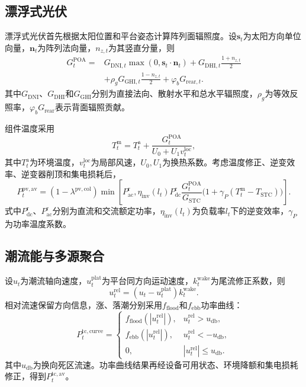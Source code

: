 \subsection{漂浮式光伏}

漂浮式光伏首先根据太阳位置和平台姿态计算阵列面辐照度。设$\bm s_t$为太阳方向单位向量，$\bm n_t$为阵列法向量，$n_{z,t}$为其竖直分量，则
\begin{equation}
\begin{aligned}
G_t^{\mathrm{POA}}={}&G_{\mathrm{DNI},t}\max(0,\bm s_t\!\cdot\!\bm n_t)
+G_{\mathrm{DHI},t}\frac{1+n_{z,t}}{2}\\
&+\rho_gG_{\mathrm{GHI},t}\frac{1-n_{z,t}}{2}
+\varphi_bG_{\mathrm{rear},t}.
\end{aligned}
\label{eq:pv-poa}
\end{equation}
其中$G_{\mathrm{DNI}}$、$G_{\mathrm{DHI}}$和$G_{\mathrm{GHI}}$分别为直接法向、散射水平和总水平辐照度，$\rho_g$为等效反照率，$\varphi_bG_{\mathrm{rear}}$表示背面辐照贡献。

组件温度采用
\[
T_t^{\mathrm m}=T_t^{\mathrm a}+\frac{G_t^{\mathrm{POA}}}{U_0+U_1v_t^{\mathrm{loc}}},
\]
其中$T_t^{\mathrm a}$为环境温度，$v_t^{\mathrm{loc}}$为局部风速，$U_0,U_1$为换热系数。考虑温度修正、逆变效率、逆变器削顶和集电损耗后，
\begin{equation}
P_t^{\mathrm{pv,av}}
=(1-\lambda^{\mathrm{pv,col}})
\min\!\left[
P_{\mathrm{ac}}^{\mathrm r},
\eta_{\mathrm{inv}}(l_t)P_{\mathrm{dc}}^{\mathrm r}
\frac{G_t^{\mathrm{POA}}}{G_{\mathrm{STC}}}
\bigl(1+\gamma_P(T_t^{\mathrm m}-T_{\mathrm{STC}})\bigr)
\right].
\label{eq:pv-ac}
\end{equation}
式中$P_{\mathrm{dc}}^{\mathrm r}$、$P_{\mathrm{ac}}^{\mathrm r}$分别为直流和交流额定功率，$\eta_{\mathrm{inv}}(l_t)$为负载率$l_t$下的逆变效率，$\gamma_P$为功率温度系数。

\subsection{潮流能与多源聚合}

设$u_t$为潮流轴向速度，$u_t^{\mathrm{plat}}$为平台同方向运动速度，$k_t^{\mathrm{wake}}$为尾流修正系数，则
\begin{equation}
u_t^{\mathrm{rel}}=(u_t-u_t^{\mathrm{plat}})k_t^{\mathrm{wake}}.
\label{eq:tidal-relative}
\end{equation}
相对流速保留方向信息，涨、落潮分别采用$f_{\mathrm{flood}}$和$f_{\mathrm{ebb}}$功率曲线：
\begin{equation}
P_t^{\mathrm{tc,curve}}=
\begin{cases}
f_{\mathrm{flood}}(|u_t^{\mathrm{rel}}|), & u_t^{\mathrm{rel}}>u_{\mathrm{db}},\\
f_{\mathrm{ebb}}(|u_t^{\mathrm{rel}}|), & u_t^{\mathrm{rel}}<-u_{\mathrm{db}},\\
0, & |u_t^{\mathrm{rel}}|\le u_{\mathrm{db}}.
\end{cases}
\label{eq:tidal-curve}
\end{equation}
其中$u_{\mathrm{db}}$为换向死区流速。功率曲线结果再经设备可用状态、环境降额和集电损耗修正，得到$P_t^{\mathrm{tc,av}}$。

